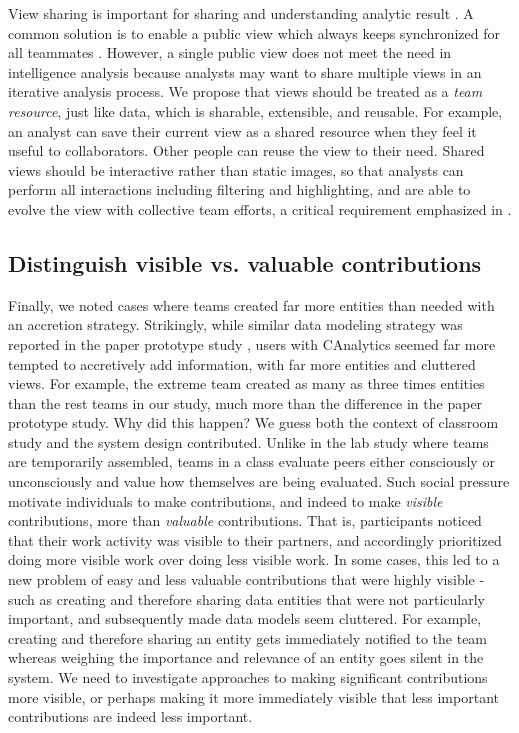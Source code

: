 View sharing is important for sharing and understanding analytic result
\cite{Morton2014a}. A common solution is to enable a public view which always
keeps synchronized for all teammates \cite{Convertino2011,Greenberg1990}.
However, a single public view does not meet the need in intelligence analysis
because analysts may want to share multiple views in an iterative analysis
process. We propose that views should be treated as a \emph{team resource}, just
like data, which is sharable, extensible, and reusable. For example, an analyst
can save their current view as a shared resource when they feel it useful to
collaborators. Other people can reuse the view to their need. Shared views
should be interactive rather than static images, so that analysts can perform
all interactions including filtering and highlighting, and are able to evolve
the view with collective team efforts, a critical requirement emphasized in
\cite{Carroll2013}.

\subsection{Distinguish visible vs. valuable contributions}

Finally, we noted cases where teams created far more entities than needed with an
accretion strategy. Strikingly, while similar data modeling strategy was
reported in the paper prototype study \cite{Carroll2013}, users with CAnalytics
seemed far more tempted to accretively add information, with far more entities
and cluttered views. For example, the extreme team created as many as three
times entities than the rest teams in our study, much more than the difference
in the paper prototype study. Why did this happen? We guess both the context of
classroom study and the system design contributed. Unlike in the lab study where
teams are temporarily assembled, teams in a class evaluate peers either
consciously or unconsciously and value how themselves are being evaluated. Such
social pressure motivate individuals to make contributions, and indeed to make
\emph{visible} contributions, more than \emph{valuable} contributions. That is,
participants noticed that their work activity was visible to their partners, and
accordingly prioritized doing more visible work over doing less visible work. In
some cases, this led to a new problem of easy and less valuable contributions
that were highly visible - such as creating and therefore sharing data entities
that were not particularly important, and subsequently made data models seem
cluttered. For example, creating and therefore sharing an entity gets
immediately notified to the team whereas weighing the importance and relevance
of an entity goes silent in the system. We need to investigate approaches to
making significant contributions more visible, or perhaps making it more
immediately visible that less important contributions are indeed less important.
